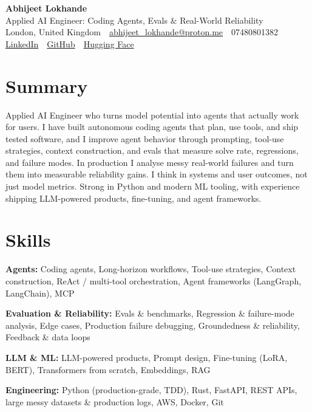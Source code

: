 \documentclass[10pt,letterpaper]{article}
\newcommand{\sep}{\,\textcolor{accent!60}{\textbar}\,}
\begin{document}
\begin{center}
  {\fontsize{24}{26}\selectfont\bfseries Abhijeet Lokhande}\\[3pt]
  {\color{accent}\large Applied AI Engineer: Coding Agents, Evals \& Real-World Reliability}\\[5pt]
  {\small
    London, United Kingdom \sep
    \href{mailto:abhijeet_lokhande@proton.me}{abhijeet\_lokhande@proton.me} \sep
    07480801382 \\[2pt]
    \href{https://www.linkedin.com/in/ablds/}{LinkedIn} \sep
    \href{https://github.com/abhijeetscode}{GitHub} \sep
    \href{https://huggingface.co/ab-ai}{Hugging Face}
  }
\end{center}
\vspace{2pt}

\section{Summary}
Applied AI Engineer who turns model potential into agents that actually work for users. I have built autonomous coding agents that plan, use tools, and ship tested software, and I improve agent behavior through prompting, tool-use strategies, context construction, and evals that measure solve rate, regressions, and failure modes. In production I analyse messy real-world failures and turn them into measurable reliability gains. I think in systems and user outcomes, not just model metrics. Strong in Python and modern ML tooling, with experience shipping LLM-powered products, fine-tuning, and agent frameworks.

\section{Skills}
\begin{tight}
  \item[\textcolor{accent}{\small$\bullet$}] \textbf{Agents:} Coding agents, Long-horizon workflows, Tool-use strategies, Context construction, ReAct / multi-tool orchestration, Agent frameworks (LangGraph, LangChain), MCP
  \item[\textcolor{accent}{\small$\bullet$}] \textbf{Evaluation \& Reliability:} Evals \& benchmarks, Regression \& failure-mode analysis, Edge cases, Production failure debugging, Groundedness \& reliability, Feedback \& data loops
  \item[\textcolor{accent}{\small$\bullet$}] \textbf{LLM \& ML:} LLM-powered products, Prompt design, Fine-tuning (LoRA, BERT), Transformers from scratch, Embeddings, RAG
  \item[\textcolor{accent}{\small$\bullet$}] \textbf{Engineering:} Python (production-grade, TDD), Rust, FastAPI, REST APIs, large messy datasets \& production logs, AWS, Docker, Git
\end{tight}
\end{document}
